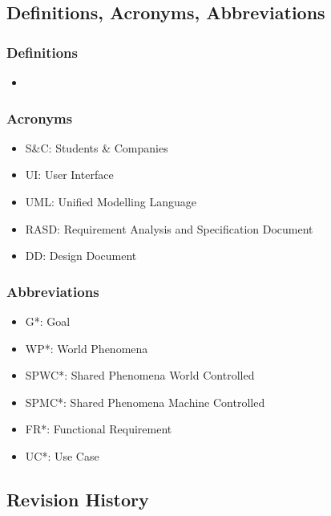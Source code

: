 
\subsection{Definitions, Acronyms, Abbreviations}

\subsubsection{Definitions}
\begin{itemize}
    \item 
\end{itemize}


\subsubsection{Acronyms}
\begin{itemize}
    \item {S\&C: Students \& Companies}
    \item {UI: User Interface}
    \item {UML: Unified Modelling Language}
    \item {RASD: Requirement Analysis and Specification Document}
    \item {DD: Design Document}
\end{itemize}


\subsubsection{Abbreviations}
\begin{itemize}
    \item {G*: Goal}
    \item {WP*: World Phenomena}
    \item {SPWC*: Shared Phenomena World Controlled}
    \item {SPMC*: Shared Phenomena Machine Controlled}
    \item {FR*: Functional Requirement}
    \item {UC*: Use Case}
\end{itemize}


\subsection{Revision History}

